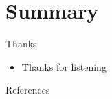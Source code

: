 \documentclass[
 size=12pt,
 paper=smartboard, %
 mode=present, %
 display=slides, %
style=tuliplab,
pauseslide,
fleqn,leqno]{powerdot}
\begin{document}


\section{Summary}

\begin{slide}{Thanks}
  \begin{itemize}
    \item Thanks for listening~
  \end{itemize}
\end{slide}
  
% 


% 
\begin{slide}{References}
  
  
\end{slide}
\end{document}
